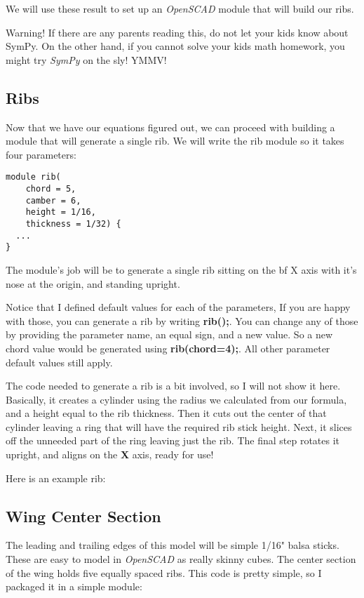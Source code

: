 We will use these result to set up an {\it OpenSCAD} module that will build our ribs.

Warning! If there are any parents reading this, do not let your kids know about
SymPy.  On the other hand, if you cannot solve your kids math homework, you
might try {\it SymPy} on the sly! YMMV!

\subsection{Ribs}

Now that we have our equations figured out, we can proceed with building a
module that will generate a single rib. We will write the rib module so it
takes four parameters:

\begin{lstlisting}
module rib(
    chord = 5,
    camber = 6,
    height = 1/16,
    thickness = 1/32) {
  ...
}
\end{lstlisting}

The module's job will be to generate a single rib sitting on the {bf X} axis
with it's nose at the origin, and standing upright.

Notice that I defined  default values for each of the parameters, If you are
happy with those, you can generate a rib by writing {\bf rib();}. You can
change any of those by providing the parameter name, an equal sign, and a new
value. So a new chord value would be generated using {\bf rib(chord=4);}. All
other parameter default values still apply.

The code needed to generate a rib is a bit involved, so I will not show it
here. Basically, it creates a cylinder using the radius we calculated from our
formula, and a height equal to the rib thickness.  Then it cuts out the center
of that cylinder leaving a ring that will have the required rib stick height.
Next, it slices off the unneeded part of the ring leaving just the rib. The
final step rotates it upright, and aligns on the {\bf X} axis, ready for use!

Here is an example rib:


\subsection{Wing Center Section}

The leading and trailing edges of this model will be simple 1/16" balsa sticks.
These are easy to model in {\it OpenSCAD} as really skinny cubes. The center section
of the wing holds five equally spaced ribs. This code is pretty simple, so I
packaged it in a simple module:

